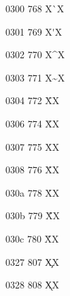 \documentclass[11pt]{article}
\begin{document}
0300 768 X{\`{}}X

0301 769 X{\'{}}X

0302 770 X{\^{}}X

0303 771 X{\~{}}X

0304 772 X{\={}}X

0306 774 X{\u{}}X

0307 775 X{\.{}}X

0308 776 X{\"{}}X

030a 778 X{\r{}}X

030b 779 X{\H{}}X

030c 780 X{\v{}}X

0327 807 X{\c{}}X

0328 808 X{\k{}}X

%
%
%
%
%
%
%
%
%
%
%
%
%
%
%
%
%
%
%
%
%
%
%
%
%
%
%
%
%
%
%
%
%
%
%
%
%
%
%
%
%
%
%
%
%
%
%
%
%
%
%
%
\end{document}
